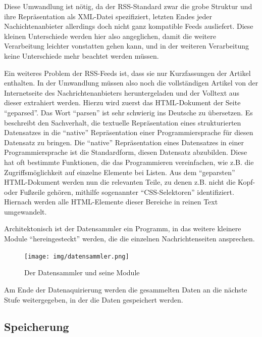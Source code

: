 \documentclass[12pt,ngerman,a4paperpaper,]{paper}
\begin{document}

Diese Umwandlung ist nötig, da der RSS-Standard zwar die grobe Struktur
und ihre Repräsentation als XML-Datei spezifiziert, letzten Endes jeder
Nachichtenanbieter allerdings doch nicht ganz kompatible Feeds
ausliefert. Diese kleinen Unterschiede werden hier also angeglichen,
damit die weitere Verarbeitung leichter vonstatten gehen kann, und in
der weiteren Verarbeitung keine Unterschiede mehr beachtet werden
müssen.

Ein weiteres Problem der RSS-Feeds ist, dass sie nur Kurzfassungen der
Artikel enthalten. In der Umwandlung müssen also noch die vollständigen
Artikel von der Internetseite des Nachrichtenanbieters heruntergeladen
und der Volltext aus dieser extrahiert werden. Hierzu wird zuerst das
HTML-Dokument der Seite ``geparsed''. Das Wort ``parsen'' ist sehr
schwierig ins Deutsche zu übersetzen. Es beschreibt den Sachverhalt, die
textuelle Repräsentation eines strukturierten Datensatzes in die
``native'' Repräsentation einer Programmiersprache für diesen Datensatz
zu bringen. Die ``native'' Repräsentation eines Datensatzes in einer
Programmiersprache ist die Standardform, diesen Datensatz abzubilden.
Diese hat oft bestimmte Funktionen, die das Programmieren vereinfachen,
wie z.B. die Zugriffsmöglichkeit auf einzelne Elemente bei Listen. Aus
dem ``geparsten'' HTML-Dokument werden nun die relevanten Teile, zu
denen z.B. nicht die Kopf- oder Fußzeile gehören, mithilfe sogenannter
``CSS-Selektoren'' identifiziert. Hiernach werden alle HTML-Elemente
dieser Bereiche in reinen Text umgewandelt.

Architektonisch ist der Datensammler ein Programm, in das weitere
kleinere Module ``hereingesteckt'' werden, die die einzelnen
Nachrichtenseiten ansprechen.

\begin{no-prefix-figure-caption}

\begin{figure}
\centering
\texttt{[image: img/datensammler.png]}
\caption{Der Datensammler und seine Module}
\end{figure}

\end{no-prefix-figure-caption}


Am Ende der Datenaquirierung werden die gesammelten Daten an die nächste
Stufe weitergegeben, in der die Daten gespeichert werden.

\subsection{Speicherung}\label{speicherung}
\end{document}
